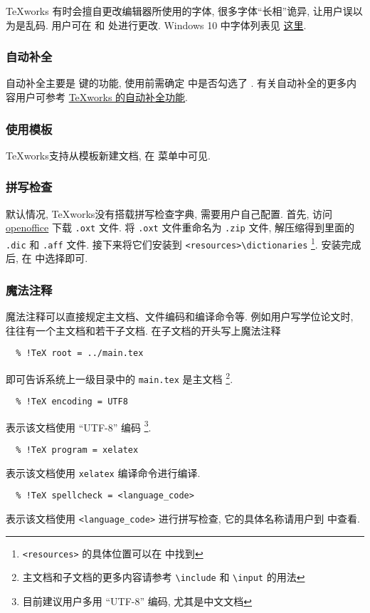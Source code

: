 \TeX works 有时会擅自更改编辑器所使用的字体,
很多字体``长相''诡异,
让用户误以为是乱码.
用户可在 
和  处进行更改.
Windows 10 中字体列表见%
\href{https://docs.microsoft.com/en-us/typography/fonts/windows_10_font_list}{这里}.

\subsubsection{自动补全}

自动补全主要是  键的功能,
使用前需确定  中是否勾选了 . 
有关自动补全的更多内容用户可参考
\href{https://github.com/EthanDeng/texworks-autocomplete}{\TeX works 的自动补全功能}. 

\subsubsection{使用模板}

\TeX works支持从模板新建文档, 在  菜单中可见. 

\subsubsection{拼写检查}

默认情况, \TeX works没有搭载拼写检查字典, 需要用户自己配置. 
首先, 访问
\href{https://extensions.openoffice.org/dictionary}{openoffice}
下载 \texttt{.oxt} 文件.
将 \texttt{.oxt} 文件重命名为 \texttt{.zip} 文件,
解压缩得到里面的 \texttt{.dic} 和 \texttt{.aff} 文件.
接下来将它们安装到
\texttt{<resources>\textbackslash dictionaries}%
\footnote{\texttt{<resources>} 的具体位置可以在
 中找到}. 
安装完成后, 在  中选择即可. 

\subsubsection{魔法注释}

魔法注释可以直接规定主文档、文件编码和编译命令等. 
例如用户写学位论文时, 往往有一个主文档和若干子文档. 
在子文档的开头写上魔法注释
\begin{lstlisting}
  % !TeX root = ../main.tex
\end{lstlisting}
即可告诉系统上一级目录中的 \texttt{main.tex} 是主文档%
\footnote{主文档和子文档的更多内容请参考 \texttt{\textbackslash include}
和 \texttt{\textbackslash input} 的用法}. 
\begin{lstlisting}
  % !TeX encoding = UTF8
\end{lstlisting}
表示该文档使用 ``UTF-8'' 编码%
\footnote{目前建议用户多用 ``UTF-8'' 编码, 尤其是中文文档}. 
\begin{lstlisting}
  % !TeX program = xelatex
\end{lstlisting}
表示该文档使用 \texttt{xelatex} 编译命令进行编译. 
\begin{lstlisting}
  % !TeX spellcheck = <language_code>
\end{lstlisting}
表示该文档使用 \texttt{<language\_code>} 进行拼写检查,
它的具体名称请用户到  中查看. 

